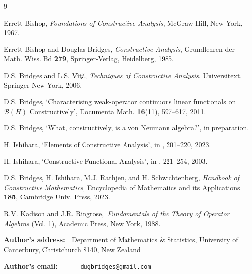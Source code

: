 \documentclass{article}%
\begin{document}
\medskip


\begin{thebibliography}{9}                                                                                                %


Errett Bishop, \emph{Foundations of Constructive Analysis},
McGraw-Hill, New York, 1967.

Errett Bishop and Douglas Bridges, \emph{Constructive Analysis},
Grundlehren der Math. Wiss. Bd \textbf{279}, Springer-Verlag, Heidelberg, 1985.

D.S. Bridges and L.S. V\^{\i}\c{t}\u{a}, \emph{Techniques of
Constructive Analysis}, Universitext, Springer New York, 2006.

D.S. Bridges, `Characterising weak-operator continuous linear
functionals on $\mathcal{B}(H)$ Constructively', Documenta Math.
\textbf{16}(11), 597--617, 2011.

D.S. Bridges, `What, constructively, is a von Neumann
algebra?', in preparation.

H. Ishihara, `Elements of Constructive Analysis', in
\cite{Handbook}, 201--220, 2023.

H. Ishihara, `Constructive Functional Analysis', in
\cite{Handbook}, 221--254, 2003.

D.S. Bridges, H. Ishihara, M.J. Rathjen, and H.
Schwichtenberg, \emph{Handbook of Constructive Mathematics, }Encyclopedia of
Mathematics and its Applications \textbf{185}, Cambridge Univ. Press, 2023.

R.V. Kadison and J.R. Ringrose,\emph{\ Fundamentals of the Theory
of Operator Algebras} (Vol. 1), Academic Press, New York, 1988.
\end{thebibliography}

%

\bigskip
%

\noindent
\textbf{Author's address: \ }Department of Mathematics \& Statistics,
University of Canterbury, Christchurch 8140, New Zealand%

\noindent
\textbf{Author's email: \ \ \ \ \ }\texttt{dugbridges@gmail.com}
\end{document}
